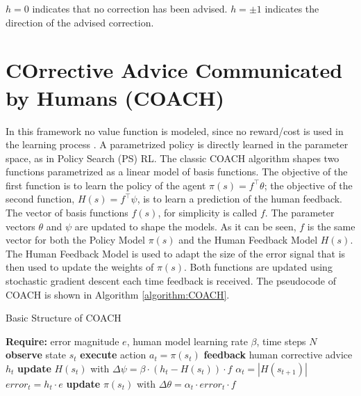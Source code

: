 $h=0$ indicates that no correction has been advised. $h=\pm 1$ indicates the direction of the advised correction.

\section{COrrective Advice Communicated by Humans (COACH)}
In this framework no value function is modeled, since no reward/cost is used in the learning process \cite{Celemin2018AnInteractive}. A parametrized policy is directly learned in the parameter space, as in Policy Search (PS) RL. 
The classic COACH algorithm shapes two functions parametrized as a linear model of basis functions. The objective of the first function is to learn the policy of the agent $\pi(s)=f^{\top}\theta$; the objective of the second function, $H(s)=f^{\top}\psi$, is to learn a prediction of the human feedback. The vector of basis functions $f(s)$, for simplicity is called $f$. The parameter vectors $\theta$ and $\psi$ are updated to shape the models. As it can be seen, $f$ is the same vector for both the Policy Model $\pi(s)$ and the Human Feedback Model  $H(s)$. The Human Feedback Model is used to adapt the size of the error signal that is then used to update the weights of $\pi(s)$. Both functions are updated using stochastic gradient descent each time feedback is received. The pseudocode of COACH is shown in Algorithm \ref{algorithm:COACH}.

\begin{algorithm}[H]
\caption{Basic Structure of COACH}\label{algorithm:COACH}
\begin{algorithmic}[1]
\State \textbf{Require:} error magnitude $e$, human model learning rate $\beta$, time steps $N$
\State \textbf{observe} state $s_{t}$
\State \textbf{execute} action $a_{t}=\pi(s_{t})$
\State \textbf{feedback} human corrective advice $h_{t}$
\State \textbf{update} $H(s_{t})$ with $\Delta \psi = \beta\cdot (h_{t}-H(s_{t}))\cdot f$
\State $\alpha_{t} = |H(s_{t+1})|$
\State $error_{t} = h_{t}\cdot e$
\State \textbf{update} $\pi(s_{t})$ with $\Delta \theta = \alpha_{t} \cdot error_{t} \cdot f$
\EndIf
\EndFor
\end{algorithmic}
\end{algorithm}